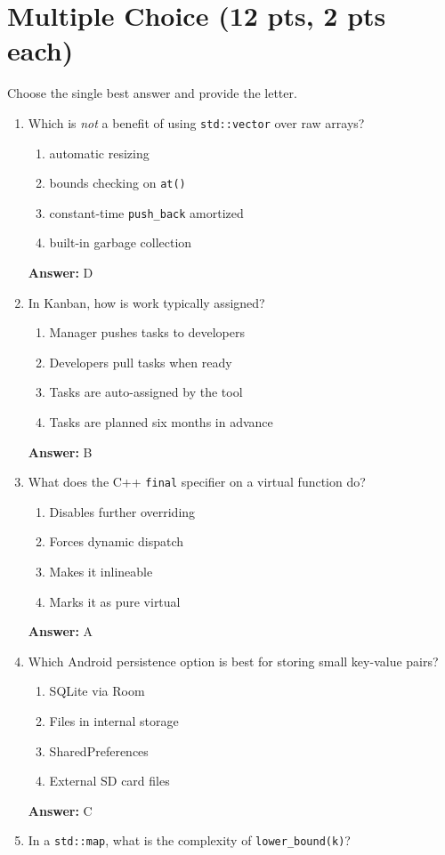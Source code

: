 \documentclass[12pt]{article}
\begin{document}
\section{Multiple Choice (12 pts, 2 pts each)}
Choose the single best answer and provide the letter.
\begin{enumerate}[label=\arabic*.]
\item Which is \emph{not} a benefit of using \texttt{std::vector} over raw arrays?
\begin{enumerate}[label=(\Alph*)]
\item automatic resizing
\item bounds checking on \texttt{at()}
\item constant-time \texttt{push\_back} amortized
\item built-in garbage collection
\end{enumerate}
\textbf{Answer:} D
\item In Kanban, how is work typically assigned?
\begin{enumerate}[label=(\Alph*)]
\item Manager pushes tasks to developers
\item Developers pull tasks when ready
\item Tasks are auto-assigned by the tool
\item Tasks are planned six months in advance
\end{enumerate}
\textbf{Answer:} B
\item What does the C++ \texttt{final} specifier on a virtual function do?
\begin{enumerate}[label=(\Alph*)]
\item Disables further overriding
\item Forces dynamic dispatch
\item Makes it inlineable
\item Marks it as pure virtual
\end{enumerate}
\textbf{Answer:} A
\item Which Android persistence option is best for storing small key-value pairs?
\begin{enumerate}[label=(\Alph*)]
\item SQLite via Room
\item Files in internal storage
\item SharedPreferences
\item External SD card files
\end{enumerate}
\textbf{Answer:} C
\item In a \texttt{std::map}, what is the complexity of \texttt{lower\_bound(k)}?

\end{enumerate}
\end{document}
